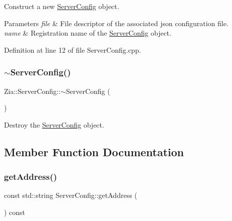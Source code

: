 Construct a new \hyperlink{class_zia_1_1_server_config}{Server\+Config} object. 


\begin{DoxyParams}{Parameters}
{\em file} & File descriptor of the associated json configuration file. \\
\hline
{\em name} & Registration name of the \hyperlink{class_zia_1_1_server_config}{Server\+Config} object. \\
\hline
\end{DoxyParams}


Definition at line 12 of file Server\+Config.\+cpp.

\mbox{\label{class_zia_1_1_server_config_aed6f704e1b0c3fa4b7abe44d7dcc3d06}} 
\subsubsection{\texorpdfstring{$\sim$\+Server\+Config()}{~ServerConfig()}}
{\footnotesize\ttfamily Zia\+::\+Server\+Config\+::$\sim$\+Server\+Config (\begin{DoxyParamCaption}{ }\end{DoxyParamCaption})\hspace{0.3cm}{\ttfamily [default]}}



Destroy the \hyperlink{class_zia_1_1_server_config}{Server\+Config} object. 



\subsection{Member Function Documentation}
\mbox{\label{class_zia_1_1_server_config_a0df081f26973e1a5182adf8f3d6495ae}} 
\subsubsection{\texorpdfstring{get\+Address()}{getAddress()}}
{\footnotesize\ttfamily const std\+::string Server\+Config\+::get\+Address (\begin{DoxyParamCaption}{ }\end{DoxyParamCaption}) const\hspace{0.3cm}{\ttfamily [noexcept]}}



